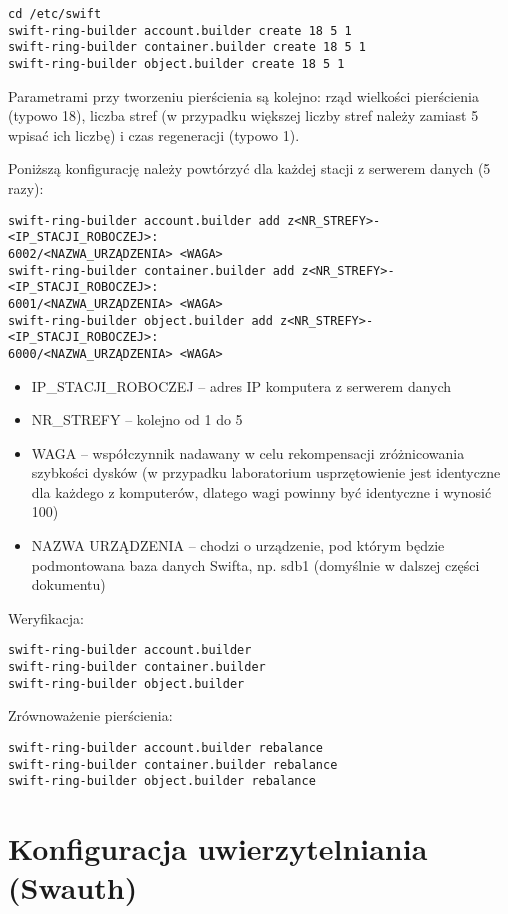 \documentclass[12pt]{article}
\begin{document}
\begin{verbatim}
cd /etc/swift
swift-ring-builder account.builder create 18 5 1
swift-ring-builder container.builder create 18 5 1
swift-ring-builder object.builder create 18 5 1
\end{verbatim}

Parametrami przy tworzeniu pierścienia są kolejno: rząd wielkości pierścienia (typowo 18), liczba stref (w przypadku większej liczby stref należy zamiast 5 wpisać ich liczbę) i czas regeneracji (typowo 1).

Poniższą konfigurację należy powtórzyć dla każdej stacji z serwerem danych (5 razy):

\begin{verbatim}
swift-ring-builder account.builder add z<NR_STREFY>-<IP_STACJI_ROBOCZEJ>:
6002/<NAZWA_URZĄDZENIA> <WAGA>
swift-ring-builder container.builder add z<NR_STREFY>-<IP_STACJI_ROBOCZEJ>:
6001/<NAZWA_URZĄDZENIA> <WAGA>
swift-ring-builder object.builder add z<NR_STREFY>-<IP_STACJI_ROBOCZEJ>:
6000/<NAZWA_URZĄDZENIA> <WAGA>
\end{verbatim}

\begin{itemize}
\item IP\_STACJI\_ROBOCZEJ – adres IP komputera z serwerem danych
\item NR\_STREFY – kolejno od 1 do 5
\item WAGA – współczynnik nadawany w celu rekompensacji zróżnicowania szybkości dysków (w przypadku laboratorium usprzętowienie jest identyczne dla każdego z komputerów, dlatego wagi powinny być identyczne i wynosić 100)
\item NAZWA URZĄDZENIA – chodzi o urządzenie, pod którym będzie podmontowana baza danych Swifta, np. sdb1 (domyślnie w dalszej części dokumentu)
\end{itemize}

Weryfikacja:
\begin{verbatim}
swift-ring-builder account.builder
swift-ring-builder container.builder
swift-ring-builder object.builder
\end{verbatim}

Zrównoważenie pierścienia:
\begin{verbatim}
swift-ring-builder account.builder rebalance
swift-ring-builder container.builder rebalance
swift-ring-builder object.builder rebalance
\end{verbatim}

\section{Konfiguracja uwierzytelniania (Swauth)}
\end{document}
